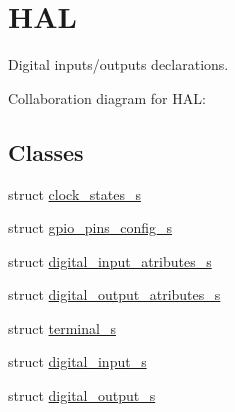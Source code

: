 \hypertarget{group__hal}{}\section{H\+AL}
\label{group__hal}


Digital inputs/outputs declarations.  


Collaboration diagram for H\+AL\+:
\subsection*{Classes}
\begin{DoxyCompactItemize}
\item 
struct \hyperlink{structclock__states__s}{clock\+\_\+states\+\_\+s}
\item 
struct \hyperlink{structgpio__pins__config__s}{gpio\+\_\+pins\+\_\+config\+\_\+s}
\item 
struct \hyperlink{structdigital__input__atributes__s}{digital\+\_\+input\+\_\+atributes\+\_\+s}
\item 
struct \hyperlink{structdigital__output__atributes__s}{digital\+\_\+output\+\_\+atributes\+\_\+s}
\item 
struct \hyperlink{structterminal__s}{terminal\+\_\+s}
\item 
struct \hyperlink{structdigital__input__s}{digital\+\_\+input\+\_\+s}
\item 
struct \hyperlink{structdigital__output__s}{digital\+\_\+output\+\_\+s}
\end{DoxyCompactItemize}
